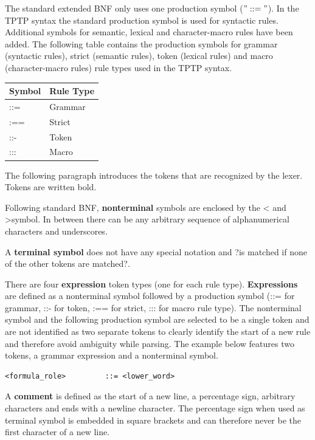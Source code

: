 The standard extended BNF only uses one production symbol ($"::="$).
In the TPTP syntax the standard production symbol is used for syntactic rules.
Additional symbols for semantic, lexical and character-macro rules have been added.
The following table contains the production symbols for grammar (syntactic rules), strict (semantic rules), token (lexical rules) and macro (character-macro rules) rule types used in the TPTP syntax.
\begin{table}[H]
\centering
\renewcommand{\arraystretch}{1}
\begin{tabular}{ll}
\textbf{Symbol} & \textbf{Rule Type}\\\hline
::= & Grammar\\
:== & Strict\\
::- & Token\\
::: & Macro\\
\end{tabular}
\label{tbl:ConceptTPTPProductionSymbols}
\end{table}


The following paragraph introduces the tokens that are recognized by the lexer. Tokens are written bold.

Following standard BNF, \textbf{nonterminal} symbols are enclosed by the \textless\; and \textgreater \;symbol.
In between there can be any arbitrary sequence of alphanumerical characters and underscores.

A \textbf{terminal symbol} does not have any special notation and ?is matched if none of the other tokens are matched?.

There are four \textbf{expression} token types (one for each rule type).
\textbf{Expressions} are defined as a nonterminal symbol followed by a production symbol (::= for grammar, ::- for token, :== for strict, ::: for macro rule type).
The nonterminal symbol and the following production symbol are selected to be a single token and are not identified as two separate tokens to clearly identify the start of a new rule and therefore avoid ambiguity while parsing.
The example below features two tokens, a grammar expression and a nonterminal symbol.
\begin{verbatim}
<formula_role>         ::= <lower_word>
\end{verbatim}

A \textbf{comment} is defined as the start of a new line, a percentage sign, arbitrary characters and ends with a newline character.
The percentage sign when used as terminal symbol is embedded in square brackets and can therefore never be the first character of a new line.

